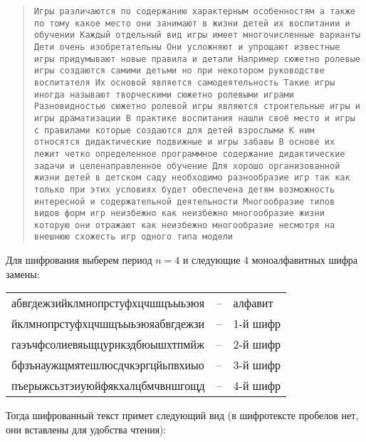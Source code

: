 \begin{quote}
    \noindent \texttt{Игры различаются по содержанию характерным особенностям а также по тому какое место они занимают в жизни детей их воспитании и обучении Каждый отдельный вид игры имеет многочисленные варианты Дети очень изобретательны Они усложняют и упрощают известные игры придумывают новые правила и детали Например сюжетно ролевые игры создаются самими детьми но при некотором руководстве воспитателя Их основой является самодеятельность Такие игры иногда называют творческими сюжетно ролевыми играми Разновидностью сюжетно ролевой игры являются строительные игры и игры драматизации В практике воспитания нашли своё место и игры с правилами которые создаются для детей взрослыми К ним относятся дидактические подвижные и игры забавы В основе их лежит четко определенное программное содержание дидактические задачи и целенаправленное обучение Для хорошо организованной жизни детей в детском саду необходимо разнообразие игр так как только при этих условиях будет обеспечена детям возможность интересной и содержательной деятельности Многообразие типов видов форм игр неизбежно как неизбежно многообразие жизни которую они отражают как неизбежно многообразие несмотря на внешнюю схожесть игр одного типа модели}
\end{quote}

Для шифрования выберем период $n=4$ и следующие 4 моноалфавитных шифра замены:

\begin{center} \begin{tabular}{|lcl|}
    \hline
    абвгдежзийклмнопрстуфхцчшщъыьэюя & -- & алфавит \\
    йклмнопрстуфхцчшщъыьэюяабвгдежзи & -- & 1-й шифр \\
    гаэъчфсолиевяьщцурнкздбюышхтпмйж & -- & 2-й шифр \\
    бфзънаужщмятешлюсдчкэргцйьпвхиыо & -- & 3-й шифр \\
    пъерыжсьзтэиуюйфякхалцбмчвншгощд & -- & 4-й шифр \\
    \hline
\end{tabular} \end{center}

Тогда шифрованный текст примет следующий вид (в шифротексте пробелов нет, они вставлены для удобства чтения):

